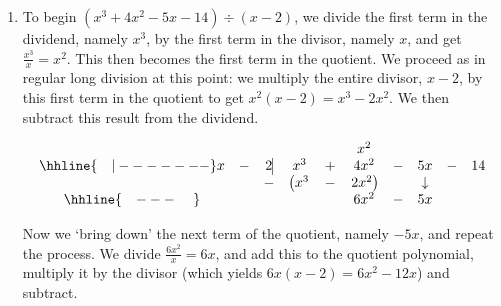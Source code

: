 \documentclass{ximera}
\begin{document}
\begin{exampleSol}
    \begin{enumerate}
        \item  To begin $\left(x^3 + 4x^2 - 5x - 14\right) \div (x-2)$, we divide the first term in the dividend, namely $x^3$, by the first term in the divisor, namely $x$, and get $\frac{x^3}{x} = x^2$. This then becomes the first term in the quotient.  We proceed as in regular long division at this point: we multiply the entire divisor, $x-2$, by this first term in the quotient to get $x^{2}(x - 2) = x^3 - 2x^2$.  We then subtract this result from the dividend.
            
            \setlength\arraycolsep{0.1pt}\setlength\extrarowheight{2pt}
            \[ 
            \begin{array}{cccccccccc}
            & & & & & x^2 & & &  &  \\ \hhline{~~~|-------}
            x & - & 2  \vline& x^3 & + & 4x^2 & - & 5x & - & 14 \\
             &  &  -& \left(x^3 \right. & - & \left.  2x^2\right) &  & \downarrow &  &  \\ \hhline{~~~---~~~~} 
             &  &  &   &  & 6 x^2 & - & 5x &  &  \\ 
            \end{array}
            \]
            
            \setlength\arraycolsep{5pt}
            \setlength\extrarowheight{0pt} 
            
            Now we `bring down' the next term of the quotient, namely $-5x$, and repeat the process. We divide $\frac{6x^2}{x} = 6x$, and add this to the quotient polynomial, multiply it by the divisor (which yields $6x(x - 2) = 6x^{2} - 12x$) and subtract. \setlength\arraycolsep{0.1pt}\setlength\extrarowheight{2pt}
            

\end{enumerate}
\end{exampleSol}
\end{document}
